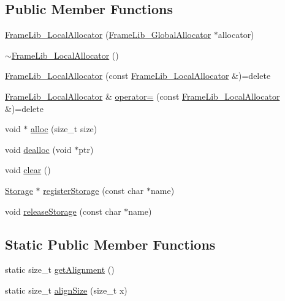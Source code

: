\subsection*{Public Member Functions}
\begin{DoxyCompactItemize}
\item 
\hyperlink{class_frame_lib___local_allocator_a218131bb74240289b83dc7cd0e0ad6a7}{Frame\+Lib\+\_\+\+Local\+Allocator} (\hyperlink{class_frame_lib___global_allocator}{Frame\+Lib\+\_\+\+Global\+Allocator} $\ast$allocator)
\item 
\hyperlink{class_frame_lib___local_allocator_a7c7bc361ea0fc016fdc7da6282c963d4}{$\sim$\+Frame\+Lib\+\_\+\+Local\+Allocator} ()
\item 
\hyperlink{class_frame_lib___local_allocator_ad59cc2ff2acce853dddb8eb3ff38073d}{Frame\+Lib\+\_\+\+Local\+Allocator} (const \hyperlink{class_frame_lib___local_allocator}{Frame\+Lib\+\_\+\+Local\+Allocator} \&)=delete
\item 
\hyperlink{class_frame_lib___local_allocator}{Frame\+Lib\+\_\+\+Local\+Allocator} \& \hyperlink{class_frame_lib___local_allocator_ad398ba077e9f04c3508ba5cf5250d01c}{operator=} (const \hyperlink{class_frame_lib___local_allocator}{Frame\+Lib\+\_\+\+Local\+Allocator} \&)=delete
\item 
void $\ast$ \hyperlink{class_frame_lib___local_allocator_a47d3c43f0a7d094b7d237850523828df}{alloc} (size\+\_\+t size)
\item 
void \hyperlink{class_frame_lib___local_allocator_ab0e907ad680da0a20143c1fe251d0ec8}{dealloc} (void $\ast$ptr)
\item 
void \hyperlink{class_frame_lib___local_allocator_a5d4eef90190d3699cb2026da02749dd5}{clear} ()
\item 
\hyperlink{class_frame_lib___local_allocator_1_1_storage}{Storage} $\ast$ \hyperlink{class_frame_lib___local_allocator_a9659c558d40a3c5b41c1d09f293c39bf}{register\+Storage} (const char $\ast$name)
\item 
void \hyperlink{class_frame_lib___local_allocator_a5bbca2317e172ec8afa22be33a70d748}{release\+Storage} (const char $\ast$name)
\end{DoxyCompactItemize}
\subsection*{Static Public Member Functions}
\begin{DoxyCompactItemize}
\item 
static size\+\_\+t \hyperlink{class_frame_lib___local_allocator_a1925095d14b5f3e2b8e8638aea72258d}{get\+Alignment} ()
\item 
static size\+\_\+t \hyperlink{class_frame_lib___local_allocator_aecfc92521d06870cc16712a1a73ae6ee}{align\+Size} (size\+\_\+t x)
\end{DoxyCompactItemize}


